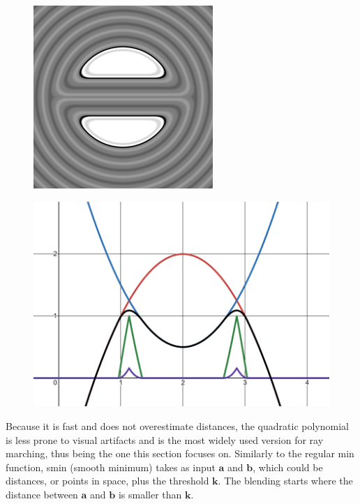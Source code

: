 \begin{figure}
\centering
\begin{minipage}{.5\textwidth}
  \centering
  \includegraphics[width=.8\linewidth]{imagens/smoothSubtraction.png}
  \label{fig:ssub}
\end{minipage}%
\begin{minipage}{.5\textwidth}
  \centering
  \includegraphics[width=.8\linewidth]{imagens/desmos_smin.png}
  \label{fig:smin}
\end{minipage}
\end{figure}

Because it is fast and does not overestimate distances, the quadratic polynomial is less prone to visual artifacts and is the most widely used version for ray marching, thus being the one this section focuses on. Similarly to the regular min function, smin (smooth minimum) takes as input $\mathbf{a}$ and $\mathbf{b}$, which could be distances, or points in space, plus the threshold $\mathbf{k}$. The blending starts where the distance between $\mathbf{a}$ and $\mathbf{b}$ is smaller than $\mathbf{k}$.

